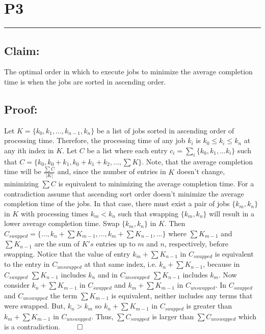 \documentclass[11pt]{article}
\title{}
\author{}
\date{}
\begin{document}
\section*{P3}

\noindent\textcolor[RGB]{220,220,220}{\rule{\linewidth}{0.8pt}}

\subsection*{Claim:} 
The optimal order in which to execute jobs to minimize the average completion time is when the jobs are sorted in ascending order. 

\subsection*{Proof:}
Let $K = \{k_0, k_1, ..., k_{n-1}, k_n\}$ be a list of jobs sorted in ascending order of processing time. Therefore, the processing time of any job $k_i$ is $k_0 \leq k_i \leq k_n$ at any ith index in $K$. Let $C$ be a list where each entry $c_i = \sum_i \{k_0, k_1, ... k_i\}$ such that $C = \{k_0, k_0 + k_1, k_0 + k_1 + k_2, ..., \sum K\}$. Note, that the average completion time will be $\frac{\sum C}{|K|}$ and, since the number of entries in $K$ doesn't change, minimizing $\sum C$ is equivalent to minimizing the average completion time. For a contradiction assume that ascending sort order doesn't minimize the average completion time of the jobs. In that case, there must exist a pair of jobs $\{k_m, k_n\}$ in $K$ with processing times $k_m < k_n$ such that swapping $\{k_m, k_n\}$ will result in a lower average completion time. Swap $\{k_m, k_n\}$ in $K$. Then $C_{swapped} = \{..., k_n + \sum K_{m-1}, ..., k_m + \sum K_{n-1}, ...\}$ where $\sum K_{m-1}$ and $\sum K_{n-1}$ are the sum of $K's$ entries up to $m$ and $n$, respectively, before swapping. Notice that the value of entry $k_m + \sum K_{n-1}$ in $C_{swapped}$ is equivalent to the entry in $C_{unswapped}$ at that same index, i.e. $k_n + \sum K_{n-1}$, because in $C_{swapped}$ $\sum K_{n-1}$ includes $k_n$ and in $C_{unswapped}$ $\sum K_{n-1}$ includes $k_m$. Now consider $k_n + \sum K_{m-1}$ in $C_{swapped}$ and $k_m + \sum K_{m-1}$ in $C_{unswapped}$. In $C_{swapped}$ and $C_{unswapped}$ the term $\sum K_{m-1}$ is equivalent, neither includes any terms that were swapped. But, $k_n > k_m$ so $k_n + \sum K_{m-1}$ in $C_{swapped}$ is greater than  $k_m + \sum K_{m-1}$ in $C_{unswapped}$. Thus, $\sum C_{swapped}$ is larger than $\sum C_{unswapped}$ which is a contradiction. $\qed$
\end{document}
